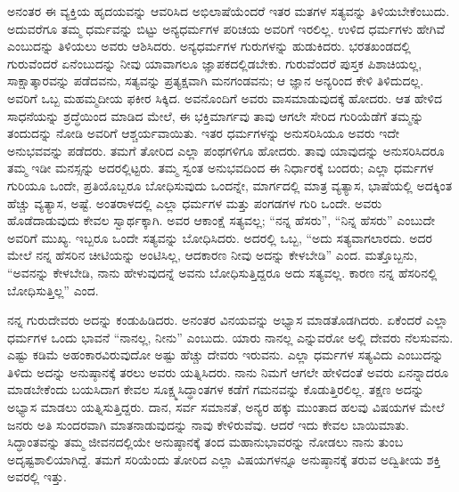 ಅನಂತರ ಈ ವ್ಯಕ್ತಿಯ ಹೃದಯವನ್ನು ಆವರಿಸಿದ ಅಭಿಲಾಷೆಯೆಂದರೆ ಇತರ ಮತಗಳ ಸತ್ಯವನ್ನು ತಿಳಿಯಬೇಕೆಂಬುದು. ಅದುವರೆಗೂ ತಮ್ಮ ಧರ್ಮವನ್ನು ಬಿಟ್ಟು ಅನ್ಯಧರ್ಮಗಳ ಪರಿಚಯ ಅವರಿಗೆ ಇರಲಿಲ್ಲ. ಉಳಿದ ಧರ್ಮಗಳು ಹೇಗಿವೆ ಎಂಬುದನ್ನು ತಿಳಿಯಲು ಅವರು ಆಶಿಸಿದರು. ಅನ್ಯಧರ್ಮಗಳ ಗುರುಗಳನ್ನು ಹುಡುಕಿದರು. ಭರತಖಂಡದಲ್ಲಿ ಗುರುವೆಂದರೆ ಏನೆಂಬುದನ್ನು ನೀವು ಯಾವಾಗಲೂ ಜ್ಞಾಪಕದಲ್ಲಿಡಬೇಕು. ಗುರುವೆಂದರೆ ಪುಸ್ತಕ ಪಿಶಾಚಿಯಲ್ಲ, ಸಾಕ್ಷಾತ್ಕಾರವನ್ನು ಪಡೆದವನು, ಸತ್ಯವನ್ನು ಪ್ರತ್ಯಕ್ಷವಾಗಿ ಮನಗಂಡವನು; ಆ ಜ್ಞಾನ ಅನ್ಯರಿಂದ ಕೇಳಿ ತಿಳಿದುದಲ್ಲ. ಅವರಿಗೆ ಒಬ್ಬ ಮಹಮ್ಮದೀಯ ಫಕೀರ ಸಿಕ್ಕಿದ. ಅವನೊಂದಿಗೆ ಅವರು ವಾಸಮಾಡುವುದಕ್ಕೆ ಹೋದರು. ಆತ ಹೇಳಿದ ಸಾಧನೆಯನ್ನು ಶ್ರದ್ಧೆಯಿಂದ ಮಾಡಿದ ಮೇಲೆ, ಈ ಭಕ್ತಿಮಾರ್ಗವು ತಾವು ಆಗಲೇ ಸೇರಿದ ಗುರಿಯೆಡೆಗೆ ತಮ್ಮನ್ನು ತಂದುದನ್ನು ನೋಡಿ ಅವರಿಗೆ ಆಶ್ಚರ್ಯವಾಯಿತು. ಇತರ ಧರ್ಮಗಳನ್ನು ಅನುಸರಿಸಿಯೂ ಅವರು ಇದೇ ಅನುಭವವನ್ನು ಪಡೆದರು. ತಮಗೆ ತೋರಿದ ಎಲ್ಲಾ ಪಂಥಗಳಿಗೂ ಹೋದರು. ತಾವು ಯಾವುದನ್ನು ಅನುಸರಿಸಿದರೂ ತಮ್ಮ ಇಡೀ ಮನಸ್ಸನ್ನು ಅದರಲ್ಲಿಟ್ಟರು. ತಮ್ಮ ಸ್ವಂತ ಅನುಭವದಿಂದ ಈ ನಿರ್ಧಾರಕ್ಕೆ ಬಂದರು; ಎಲ್ಲಾ ಧರ್ಮಗಳ ಗುರಿಯೂ ಒಂದೇ, ಪ್ರತಿಯೊಬ್ಬರೂ ಬೋಧಿಸುವುದು ಒಂದನ್ನೇ, ಮಾರ್ಗದಲ್ಲಿ ಮಾತ್ರ ವ್ಯತ್ಯಾಸ, ಭಾಷೆಯಲ್ಲಿ ಅದಕ್ಕಿಂತ ಹೆಚ್ಚು ವ್ಯತ್ಯಾಸ, ಅಷ್ಟೆ. ಅಂತರಾಳದಲ್ಲಿ ಎಲ್ಲಾ ಧರ್ಮಗಳ ಮತ್ತು ಪಂಗಡಗಳ ಗುರಿ ಒಂದೇ. ಅವರು ಹೊಡೆದಾಡುವುದು ಕೇವಲ ಸ್ವಾರ್ಥಕ್ಕಾಗಿ. ಅವರ ಆಕಾಂಕ್ಷೆ ಸತ್ಯವಲ್ಲ; “ನನ್ನ ಹೆಸರು”, “ನಿನ್ನ ಹೆಸರು” ಎಂಬುದೇ ಅವರಿಗೆ ಮುಖ್ಯ. ಇಬ್ಬರೂ ಒಂದೇ ಸತ್ಯವನ್ನು ಬೋಧಿಸಿದರು. ಅದರಲ್ಲಿ ಒಬ್ಬ, “ಅದು ಸತ್ಯವಾಗಲಾರದು. ಅದರ ಮೇಲೆ ನನ್ನ ಹೆಸರಿನ ಚೀಟಿಯನ್ನು ಅಂಟಿಸಿಲ್ಲ, ಆದಕಾರಣ ನೀವು ಅದನ್ನು ಕೇಳಬೇಡಿ” ಎಂದ. ಮತ್ತೊಬ್ಬನು, “ಅವನನ್ನು ಕೇಳಬೇಡಿ, ನಾನು ಹೇಳುವುದನ್ನೆ ಅವನು ಬೋಧಿಸುತ್ತಿದ್ದರೂ ಅದು ಸತ್ಯವಲ್ಲ. ಕಾರಣ ನನ್ನ ಹೆಸರಿನಲ್ಲಿ ಬೋಧಿಸುತ್ತಿಲ್ಲ” ಎಂದ.

ನನ್ನ ಗುರುದೇವರು ಅದನ್ನು ಕಂಡುಹಿಡಿದರು. ಅನಂತರ ವಿನಯವನ್ನು ಅಭ್ಯಾಸ ಮಾಡತೊಡಗಿದರು. ಏಕೆಂದರೆ ಎಲ್ಲಾ ಧರ್ಮಗಳ ಒಂದು ಭಾವನೆ “ನಾನಲ್ಲ, ನೀನು” ಎಂಬುದು. ಯಾರು ನಾನಲ್ಲ ಎನ್ನುವರೋ ಅಲ್ಲಿ ದೇವರು ನೆಲಸುವನು. ಎಷ್ಟು ಕಡಿಮೆ ಅಹಂಕಾರವಿರುವುದೋ ಅಷ್ಟು ಹೆಚ್ಚು ದೇವರು ಇರುವನು. ಎಲ್ಲಾ ಧರ್ಮಗಳ ಸತ್ಯವಿದು ಎಂಬುದನ್ನು ತಿಳಿದು ಅದನ್ನು ಅನುಷ್ಠಾನಕ್ಕೆ ತರಲು ಅವರು ಯತ್ನಿಸಿದರು. ನಾನು ನಿಮಗೆ ಆಗಲೇ ಹೇಳಿದಂತೆ ಅವರು ಏನನ್ನಾದರೂ ಮಾಡಬೇಕೆಂದು ಬಯಸಿದಾಗ ಕೇವಲ ಸೂಕ್ಷ್ಮಸಿದ್ಧಾಂತಗಳ ಕಡೆಗೆ ಗಮನವನ್ನು ಕೊಡುತ್ತಿರಲಿಲ್ಲ. ತಕ್ಷಣ ಅದನ್ನು ಅಭ್ಯಾಸ ಮಾಡಲು ಯತ್ನಿಸುತ್ತಿದ್ದರು. ದಾನ, ಸರ್ವ ಸಮಾನತೆ, ಅನ್ಯರ ಹಕ್ಕು ಮುಂತಾದ ಹಲವು ವಿಷಯಗಳ ಮೇಲೆ ಜನರು ಅತಿ ಸುಂದರವಾಗಿ ಮಾತನಾಡುವುದನ್ನು ನಾವು ಕೇಳಿರುವೆವು. ಆದರೆ ಇದು ಕೇವಲ ಬಾಯಿಮಾತು. ಸಿದ್ಧಾಂತವನ್ನು ತಮ್ಮ ಜೀವನದಲ್ಲಿಯೇ ಅನುಷ್ಠಾನಕ್ಕೆ ತಂದ ಮಹಾನುಭಾವರನ್ನು ನೋಡಲು ನಾನು ತುಂಬ ಅದೃಷ್ಟಶಾಲಿಯಾಗಿದ್ದೆ. ತಮಗೆ ಸರಿಯೆಂದು ತೋರಿದ ಎಲ್ಲಾ ವಿಷಯಗಳನ್ನೂ ಅನುಷ್ಠಾನಕ್ಕೆ ತರುವ ಅದ್ವಿತೀಯ ಶಕ್ತಿ ಅವರಲ್ಲಿ ಇತ್ತು.

